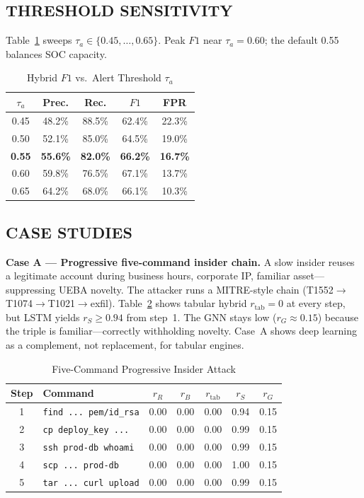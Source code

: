 \subsection{THRESHOLD SENSITIVITY}
Table~\ref{art-tab:threshold-sweep} sweeps $\tau_a\in\{0.45,\ldots,0.65\}$. Peak $F1$ near $\tau_a=0.60$; the default 0.55 balances SOC capacity.

\begin{table}[H]
\caption{Hybrid $F1$ vs.\ Alert Threshold $\tau_a$}
\label{art-tab:threshold-sweep}
\centering
\scriptsize
\begin{tabular}{@{}ccccc@{}}
\toprule
$\tau_a$ & Prec. & Rec. & $F1$ & FPR \\
\midrule
0.45 & 48.2\% & 88.5\% & 62.4\% & 22.3\% \\
0.50 & 52.1\% & 85.0\% & 64.5\% & 19.0\% \\
\textbf{0.55} & \textbf{55.6\%} & \textbf{82.0\%} & \textbf{66.2\%} & \textbf{16.7\%} \\
0.60 & 59.8\% & 76.5\% & 67.1\% & 13.7\% \\
0.65 & 64.2\% & 68.0\% & 66.1\% & 10.3\% \\
\bottomrule
\end{tabular}
\end{table}

\subsection{CASE STUDIES}

\textbf{Case A --- Progressive five-command insider chain.}
A slow insider reuses a legitimate account during business hours, corporate IP, familiar asset---suppressing UEBA novelty. The attacker runs a MITRE-style chain (T1552$\rightarrow$T1074$\rightarrow$T1021$\rightarrow$exfil). Table~\ref{art-tab:sequence-attack} shows tabular hybrid $r_{\mathrm{tab}}=0$ at every step, but LSTM yields $r_S\geq 0.94$ from step~1. The GNN stays low ($r_G\approx 0.15$) because the triple is familiar---correctly withholding novelty. Case~A shows deep learning as a complement, not replacement, for tabular engines.

\begin{table}[H]
\caption{Five-Command Progressive Insider Attack}
\label{art-tab:sequence-attack}
\centering
\scriptsize
\begin{tabular}{@{}clccccc@{}}
\toprule
\textbf{Step} & \textbf{Command} & $r_R$ & $r_B$ & $r_{\mathrm{tab}}$ & $r_S$ & $r_G$ \\
\midrule
1 & \texttt{find ... pem/id\_rsa} & 0.00 & 0.00 & 0.00 & 0.94 & 0.15 \\
2 & \texttt{cp deploy\_key ...} & 0.00 & 0.00 & 0.00 & 0.99 & 0.15 \\
3 & \texttt{ssh prod-db whoami} & 0.00 & 0.00 & 0.00 & 0.99 & 0.15 \\
4 & \texttt{scp ... prod-db} & 0.00 & 0.00 & 0.00 & 1.00 & 0.15 \\
5 & \texttt{tar ... curl upload} & 0.00 & 0.00 & 0.00 & 0.99 & 0.15 \\
\bottomrule
\end{tabular}
\end{table}

